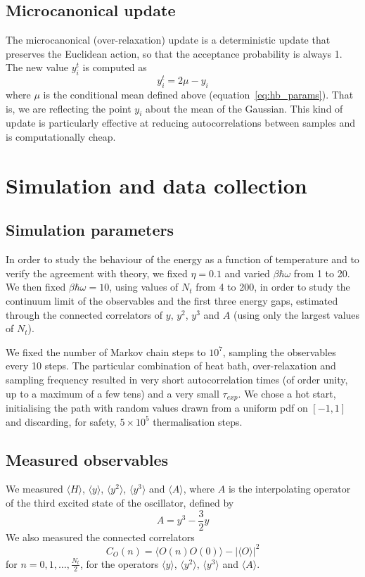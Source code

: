 \documentclass[10pt,a4paper]{article}
\begin{document}
\subsection{Microcanonical update}
The microcanonical (over-relaxation) update is a deterministic update that preserves
the Euclidean action, so that the acceptance probability is always 1. The new value
$y_i^{t}$ is computed as
\begin{equation}
    y_i^{t} = 2\mu - y_i
    \label{eq:overrelax}
\end{equation}
where $\mu$ is the conditional mean defined above (equation~\ref{eq:hb_params}).
That is, we are reflecting the point $y_i$ about the mean of the Gaussian. This kind
of update is particularly effective at reducing autocorrelations between samples and
is computationally cheap.

\section{Simulation and data collection}

\subsection{Simulation parameters}
In order to study the behaviour of the energy as a function of temperature and to
verify the agreement with theory, we fixed $\eta = 0.1$ and varied $\beta\hbar\omega$
from 1 to 20. We then fixed $\beta\hbar\omega = 10$, using values of $N_t$ from 4 to
200, in order to study the continuum limit of the observables and the first three
energy gaps, estimated through the connected correlators of $y$, $y^2$, $y^3$ and
$A$ (using only the largest values of $N_t$).

We fixed the number of Markov chain steps to $10^7$, sampling the observables every
10 steps. The particular combination of heat bath, over-relaxation and sampling
frequency resulted in very short autocorrelation times (of order unity, up to a
maximum of a few tens) and a very small $\tau_{exp}$.
We chose a hot start, initialising the path with random values drawn from a uniform
pdf on $[-1,1]$ and discarding, for safety, $5\times 10^5$ thermalisation steps.

\subsection{Measured observables}
We measured $\langle H \rangle$, $\langle y \rangle$, $\langle y^2 \rangle$,
$\langle y^3 \rangle$ and $\langle A \rangle$, where $A$ is the interpolating
operator of the third excited state of the oscillator, defined by
\begin{equation}
    A = y^3 - \frac{3}{2} y
    \label{eq:operator_A}
\end{equation}
We also measured the connected correlators
\begin{equation}
    C_O(n) = \langle O(n) O(0) \rangle - |\langle O \rangle|^2
    \label{eq:connected_corr}
\end{equation}
for $n=0,1,\dots,\frac{N_t}{2}$, for the operators $\langle y \rangle$,
$\langle y^2 \rangle$, $\langle y^3 \rangle$ and $\langle A \rangle$.
\end{document}
